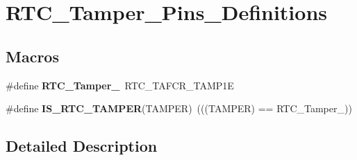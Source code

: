 \hypertarget{group___r_t_c___tamper___pins___definitions}{}\section{R\+T\+C\+\_\+\+Tamper\+\_\+\+Pins\+\_\+\+Definitions}
\label{group___r_t_c___tamper___pins___definitions}
\subsection*{Macros}
\begin{DoxyCompactItemize}
\item 
\hypertarget{group___r_t_c___tamper___pins___definitions_ga536970a32944a7a76f976ffb5b9c6a1f}{}\#define {\bfseries R\+T\+C\+\_\+\+Tamper\+\_}~R\+T\+C\+\_\+\+T\+A\+F\+C\+R\+\_\+\+T\+A\+M\+P1\+E\label{group___r_t_c___tamper___pins___definitions_ga536970a32944a7a76f976ffb5b9c6a1f}

\item 
\hypertarget{group___r_t_c___tamper___pins___definitions_ga8cb706b03efeeb8534eca0a20450d377}{}\#define {\bfseries I\+S\+\_\+\+R\+T\+C\+\_\+\+T\+A\+M\+P\+E\+R}(T\+A\+M\+P\+E\+R)~(((T\+A\+M\+P\+E\+R) == R\+T\+C\+\_\+\+Tamper\+\_))\label{group___r_t_c___tamper___pins___definitions_ga8cb706b03efeeb8534eca0a20450d377}

\end{DoxyCompactItemize}


\subsection{Detailed Description}
